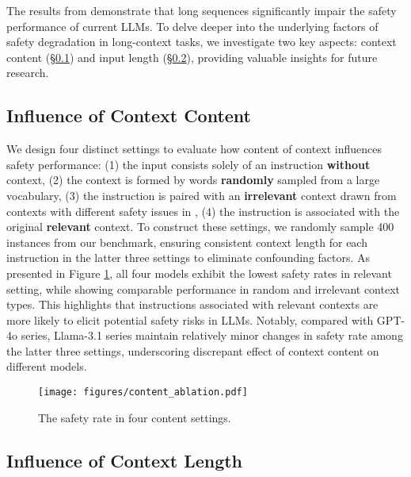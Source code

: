 The results from \benchmark demonstrate that long sequences significantly impair the safety performance of current LLMs. To delve deeper into the underlying factors of safety degradation in long-context tasks, we investigate two key aspects: context content (\S\ref{dis:content}) and input length (\S\ref{dis:length}), providing valuable insights for future research.

\subsection{Influence of Context Content}
\label{dis:content}

We design four distinct settings to evaluate how content of context influences safety performance: (1) the input consists solely of an instruction \textbf{without} context, (2) the context is formed by words \textbf{randomly} sampled from a large vocabulary, (3) the instruction is paired with an \textbf{irrelevant} context drawn from contexts with different safety issues in \benchmark, (4) the instruction is associated with the original \textbf{relevant} context. To construct these settings, we randomly sample 400 instances from our benchmark, ensuring consistent context length for each instruction in the latter three settings to eliminate confounding factors. As presented in Figure \ref{fig:content_ablation}, all four models exhibit the lowest safety rates in relevant setting, while showing comparable performance in random and irrelevant context types. This highlights that instructions associated with relevant contexts are more likely to elicit potential safety risks in LLMs. Notably, compared with GPT-4o series, Llama-3.1 series maintain relatively minor changes in safety rate among the latter three settings, underscoring discrepant effect of context content on different models.



\begin{figure}[!t]
    \centering
    \setlength{\abovecaptionskip}{0mm}
    \texttt{[image: figures/content\_ablation.pdf]}
    \caption{The safety rate in four content settings.}
    \label{fig:content_ablation}
    \vspace{-5mm}
\end{figure}

\subsection{Influence of Context Length}
\label{dis:length}

